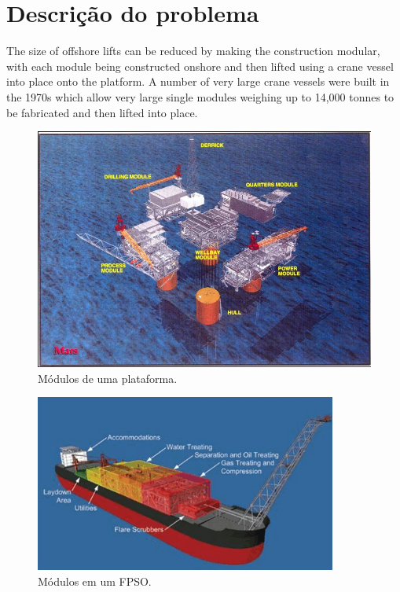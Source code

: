\section{Descrição do problema}

The size of offshore lifts can be reduced by making the construction modular,
with each module being constructed onshore and then lifted using a crane vessel 
into place onto the platform. A number of very large crane vessels were built in 
the 1970s which allow very large single modules weighing up to 14,000 tonnes to 
be fabricated and then lifted into place.

\begin{figure}[h!]
    \centering
    \includegraphics[width=0.9\columnwidth]{figs/mating/modules}
    \caption{Módulos de uma plataforma.}
    \label{modulos}
\end{figure}

\begin{figure}[h!]
    \centering
    \includegraphics[width=0.9\columnwidth]{figs/mating/fpso_modules}
    \caption{Módulos em um FPSO.}
    \label{fpso_modulos}
\end{figure}

